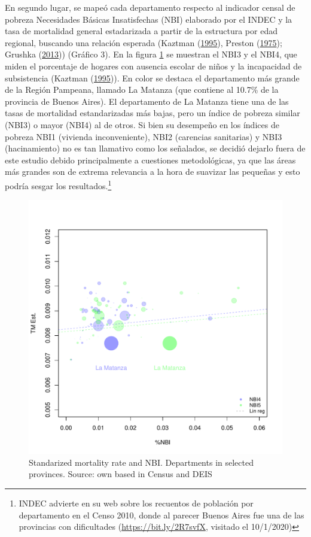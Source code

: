 \documentclass[12pt,]{article}
\begin{document}
En segundo lugar, se mapeó cada departamento respecto al indicador
censal de pobreza Necesidades Básicas Insatisfechas (NBI) elaborado por
el INDEC y la tasa de mortalidad general estadarizada a partir de la
estructura por edad regional, buscando una relación esperada (Kaztman
(\protect\hyperlink{ref-Kaztman1995}{1995}), Preston
(\protect\hyperlink{ref-Preston_1975}{1975}); Grushka
(\protect\hyperlink{ref-Grushka2013}{2013})) (Gráfico 3). En la figura
\ref{fig:NBI} se muestran el NBI3 y el NBI4, que miden el porcentaje de
hogares con ausencia escolar de niños y la incapacidad de subsistencia
(Kaztman (\protect\hyperlink{ref-Kaztman1995}{1995})). En color se
destaca el departamento más grande de la Región Pampeana, llamado La
Matanza (que contiene al 10.7\% de la provincia de Buenos Aires). El
departamento de La Matanza tiene una de las tasas de mortalidad
estandarizadas más bajas, pero un índice de pobreza similar (NBI3) o
mayor (NBI4) al de otros. Si bien su desempeño en los índices de pobreza
NBI1 (vivienda inconveniente), NBI2 (carencias sanitarias) y NBI3
(hacinamiento) no es tan llamativo como los señalados, se decidió
dejarlo fuera de este estudio debido principalmente a cuestiones
metodológicas, ya que las áreas más grandes son de extrema relevancia a
la hora de suavizar las pequeñas y esto podría sesgar los
resultados.\footnote{INDEC advierte en su web sobre los recuentos de
  población por departamento en el Censo 2010, donde al parecer Buenos
  Aires fue una de las provincias con dificultades
  (\url{https://bit.ly/2R7svfX}, visitado el 10/1/2020)}

\begin{figure}

{\centering \includegraphics[width=0.7\linewidth]{analysis/plots/ChekNBI} 

}

\caption{Standarized mortality rate and NBI. Departments in selected provinces. Source: own based in Census and DEIS}\label{fig:NBI}
\end{figure}
\end{document}
